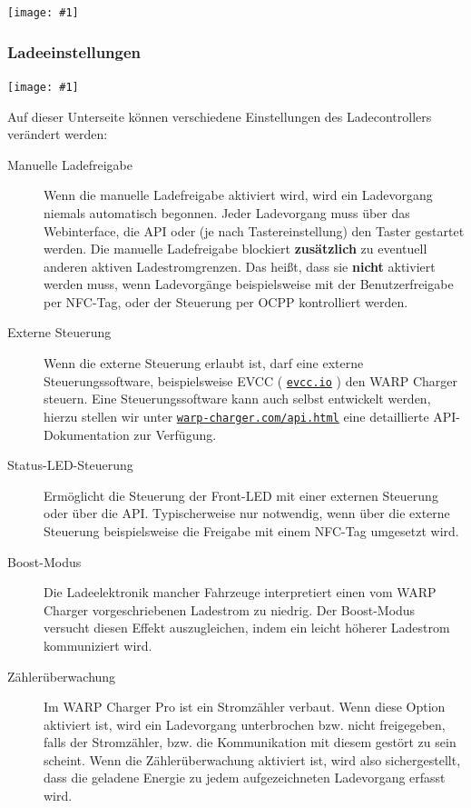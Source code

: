\documentclass[a4paper,10pt]{article}
\newcommand{\gfx}[1]{\texttt{[image: \#1]}}
\newcommand\rurl[2]{%
  \href{#1}{\nolinkurl{#2}}%
}
\begin{document}
\begin{multicols*}{2}
    \gfx{./img_warp2/resized/web_evse2}

    \subsubsection{Ladeeinstellungen}\label{evse-settings}
    \gfx{./img_warp2/resized/web_evse2_settings}

    Auf dieser Unterseite können verschiedene Einstellungen des Ladecontrollers verändert werden:

    \begin{description}
     \item[Manuelle Ladefreigabe] Wenn die manuelle Ladefreigabe aktiviert wird, wird ein Ladevorgang niemals automatisch begonnen. Jeder Ladevorgang muss über das Webinterface, die API oder (je nach Tastereinstellung) den Taster gestartet werden. Die manuelle Ladefreigabe blockiert \textbf{zusätzlich} zu eventuell anderen aktiven Ladestromgrenzen. Das heißt, dass sie \textbf{nicht} aktiviert werden muss, wenn Ladevorgänge beispielsweise mit der Benutzerfreigabe per NFC-Tag, oder der Steuerung per OCPP kontrolliert werden.
     \item[Externe Steuerung] Wenn die externe Steuerung erlaubt ist, darf eine externe Steuerungssoftware, beispielsweise
     EVCC (\rurl{https://evcc.io}{evcc.io}) den WARP Charger steuern. Eine Steuerungssoftware kann auch selbst entwickelt werden, hierzu stellen
     wir unter \rurl{https://warp-charger.com/api.html}{warp-charger.com/api.html} eine detaillierte API-Dokumentation zur Verfügung.
     \item[Status-LED-Steuerung] Ermöglicht die Steuerung der Front-LED mit einer externen Steuerung oder über die API. Typischerweise nur notwendig, wenn über die externe Steuerung beispielsweise die Freigabe mit einem NFC-Tag umgesetzt wird.
     \item[Boost-Modus] Die Ladeelektronik mancher Fahrzeuge interpretiert einen vom WARP Charger vorgeschriebenen Ladestrom zu niedrig. Der Boost-Modus versucht diesen Effekt auszugleichen, indem ein leicht höherer Ladestrom kommuniziert wird.
     \item[Zählerüberwachung] Im WARP Charger Pro ist ein Stromzähler verbaut. Wenn diese Option aktiviert ist, wird ein Ladevorgang unterbrochen bzw. nicht freigegeben, falls der Stromzähler, bzw. die Kommunikation mit diesem gestört zu sein scheint. Wenn die Zählerüberwachung aktiviert ist, wird also sichergestellt, dass die geladene Energie zu jedem aufgezeichneten Ladevorgang erfasst wird.

\end{description}
\end{multicols*}
\end{document}
